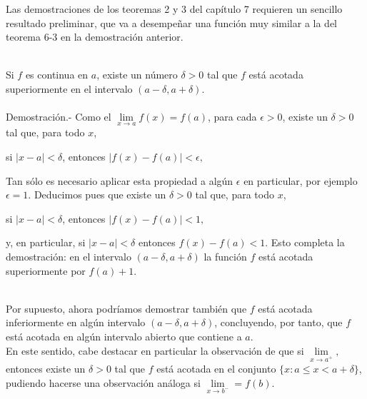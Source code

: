 Las demostraciones de los teoremas 2 y 3 del capítulo 7 requieren un sencillo resultado preliminar, que va a desempeñar una función muy similar a la del teorema 6-3 en la demostración anterior.\\\\

\setcounter{chapter}{8}
\setcounter{teo}{0}

\begin{teo}
    Si $f$ es continua en $a$, existe un número $\delta>0$ tal que $f$ está acotada superiormente en el intervalo $(a-\delta,a+\delta)$.\\\\
    Demostración.-\; Como el $\lim\limits_{x\to a} f(x) =f(a)$, para cada $\epsilon>0$, existe un $\delta>0$ tal que, para todo $x$,
    \begin{center}
	si $|x-a|<\delta$, entonces $|f(x)-f(a)|<\epsilon,$
    \end{center}
    Tan sólo es necesario aplicar esta propiedad a algún $\epsilon$ en particular, por ejemplo $\epsilon=1$. Deducimos pues que existe un $\delta>0$ tal que, para todo $x$,

    \begin{center}
	si $|x-a|<\delta$, entonces $|f(x)-f(a)|<1,$
    \end{center}

    y, en particular, si $|x-a|<\delta$ entonces $f(x)-f(a)<1$. Esto completa la demostración: en el intervalo $(a-\delta,a+\delta)$ la función $f$ está acotada superiormente por $f(a)+1.$\\\\
\end{teo}

Por supuesto, ahora podríamos demostrar también que $f$ está acotada inferiormente en algún intervalo $(a-\delta,a+\delta)$, concluyendo, por tanto, que $f$ está acotada en algún intervalo abierto que contiene a $a$.\\
En este sentido, cabe destacar en particular la observación de que si $\lim\limits_{x\to a^{+}},$ entonces existe un $\delta>0$ tal que $f$ está acotada en el conjunto $\lbrace x:a\leq x < a+\delta\rbrace$, pudiendo hacerse una observación análoga si $\lim\limits_{x\to b^-}=f(b)$.\\\\

